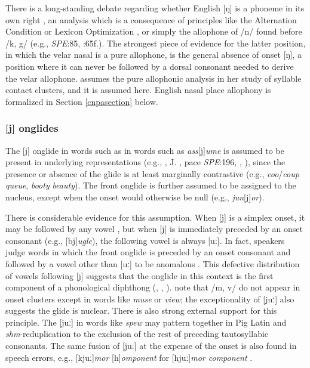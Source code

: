 There is a long-standing debate regarding whether English [ŋ] is a phoneme in its own right \citep[e.g.,][]{Sapir1925}, an analysis which is a consequence of principles like the Alternation Condition \citep{Kiparsky1968} or Lexicon Optimization \citep[][53]{OT}, or simply the allophone of /n/ found before /k, g/ (e.g., \emph{SPE}:85, \citealt{Borowsky1986}:65f.). The strongest piece of evidence for the latter position, in which the velar nasal is a pure allophone, is the general absence of onset [ŋ], a position where it can never be followed by a dorsal consonant needed to derive the velar allophone. \citet{Pierrehumbert1994} assumes the pure allophonic analysis in her study of syllable contact clusters, and it is assumed here. English nasal place allophony is formalized in Section \ref{cnpasection} below.

\subsubsection{[j] onglides}

The [j] onglide in words such as in words such as \emph{ass}[j]\emph{ume} is assumed to be present in underlying representations (e.g., \citealt[][278]{Borowsky1986}, J. \citealt{Anderson1988b}, pace \emph{SPE}:196, \citealt[][89]{Halle1985a}, \citealt[][217]{McMahon1990}), since the presence or absence of the glide is at least marginally contrastive (e.g., \emph{coo}/\emph{coup} \alt{} \emph{queue}, \emph{booty} \alt{} \emph{beauty}). The front onglide is further assumed to be assigned to the nucleus, except when the onset would otherwise be null (e.g., \emph{jun}[j]\emph{or}). 

There is considerable evidence for this assumption. When [j] is a simplex onset, it may be followed by any vowel \citep[][276]{Borowsky1986}, but when [j] is immediately preceded by an onset consonant (e.g., [bj]\emph{ugle}), the following vowel is always [uː]. In fact, speakers judge words in which the front onglide is preceded by an onset consonant and followed by a vowel other than [uː] to be anomalous \citep{Moreland2009}. This defective distribution of vowels following [j] suggests that the onglide in this context is the first component of a phonological diphthong (\citealp[][232]{Hayes1980}, \citealp[][61f.]{Harris1994}, \citealp{Davis1995}). \citet[][42]{Clements1983} note that /m, v/ do not appear in onset clusters except in words like \emph{muse} or \emph{view}; the exceptionality of [juː] also suggests the glide is nuclear. There is also strong external support for this principle. The [juː] in words like \emph{spew} may pattern together in Pig Latin \citep{Davis1995,Idsardi2005} and \emph{shm}-reduplication \citep{Nevins2003} to the exclusion of the rest of preceding tautosyllabic consonants. The same fusion of [juː] at the expense of the onset is also found in speech errors, e.g., [kjuː]\emph{mor} [h]\emph{omponent} for [hjuː]\emph{mor component} \citep[][130]{Shattuck-Hufnagel1986}. 

